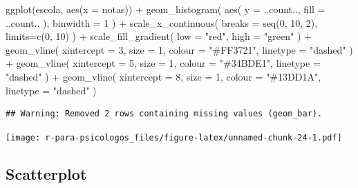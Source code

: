 \documentclass[
]{book}
\newenvironment{Shaded}{\begin{snugshade}}{\end{snugshade}}
\newcommand{\AttributeTok}[1]{\textcolor[rgb]{0.77,0.63,0.00}{#1}}
\newcommand{\DecValTok}[1]{\textcolor[rgb]{0.00,0.00,0.81}{#1}}
\newcommand{\FunctionTok}[1]{\textcolor[rgb]{0.00,0.00,0.00}{#1}}
\newcommand{\NormalTok}[1]{#1}
\newcommand{\SpecialCharTok}[1]{\textcolor[rgb]{0.00,0.00,0.00}{#1}}
\newcommand{\StringTok}[1]{\textcolor[rgb]{0.31,0.60,0.02}{#1}}
\begin{document}
\begin{Shaded}
\begin{Highlighting}[]
\FunctionTok{ggplot}\NormalTok{(escola, }\FunctionTok{aes}\NormalTok{(}\AttributeTok{x =}\NormalTok{ notas)) }\SpecialCharTok{+} 
  \FunctionTok{geom\_histogram}\NormalTok{(}
    \FunctionTok{aes}\NormalTok{(}
      \AttributeTok{y =}\NormalTok{ ..count..,}
      \AttributeTok{fill =}\NormalTok{ ..count..}
\NormalTok{      ),}
    \AttributeTok{binwidth =} \DecValTok{1}
\NormalTok{  ) }\SpecialCharTok{+}
  \FunctionTok{scale\_x\_continuous}\NormalTok{(}
    \AttributeTok{breaks =} \FunctionTok{seq}\NormalTok{(}\DecValTok{0}\NormalTok{, }\DecValTok{10}\NormalTok{, }\DecValTok{2}\NormalTok{),}
    \AttributeTok{limits=}\FunctionTok{c}\NormalTok{(}\DecValTok{0}\NormalTok{, }\DecValTok{10}\NormalTok{)}
\NormalTok{  ) }\SpecialCharTok{+}
  \FunctionTok{scale\_fill\_gradient}\NormalTok{(}
    \AttributeTok{low =} \StringTok{"red"}\NormalTok{,}
    \AttributeTok{high =} \StringTok{"green"}
\NormalTok{  ) }\SpecialCharTok{+} 
  \FunctionTok{geom\_vline}\NormalTok{(}
    \AttributeTok{xintercept =} \DecValTok{3}\NormalTok{,}
    \AttributeTok{size =} \DecValTok{1}\NormalTok{,}
    \AttributeTok{colour =} \StringTok{"\#FF3721"}\NormalTok{,}
    \AttributeTok{linetype =} \StringTok{"dashed"}
\NormalTok{  ) }\SpecialCharTok{+}
  \FunctionTok{geom\_vline}\NormalTok{(}
    \AttributeTok{xintercept =} \DecValTok{5}\NormalTok{,}
    \AttributeTok{size =} \DecValTok{1}\NormalTok{,}
    \AttributeTok{colour =} \StringTok{"\#34BDE1"}\NormalTok{,}
    \AttributeTok{linetype =} \StringTok{"dashed"}
\NormalTok{  ) }\SpecialCharTok{+}
  \FunctionTok{geom\_vline}\NormalTok{(}
    \AttributeTok{xintercept =} \DecValTok{8}\NormalTok{,}
    \AttributeTok{size =} \DecValTok{1}\NormalTok{,}
    \AttributeTok{colour =} \StringTok{"\#13DD1A"}\NormalTok{,}
    \AttributeTok{linetype =} \StringTok{"dashed"}
\NormalTok{  )}
\end{Highlighting}
\end{Shaded}

\begin{verbatim}
## Warning: Removed 2 rows containing missing values (geom_bar).
\end{verbatim}

\texttt{[image: r-para-psicologos\_files/figure-latex/unnamed-chunk-24-1.pdf]}

\hypertarget{scatterplot}{%
\subsection{Scatterplot}\label{scatterplot}}
\end{document}
